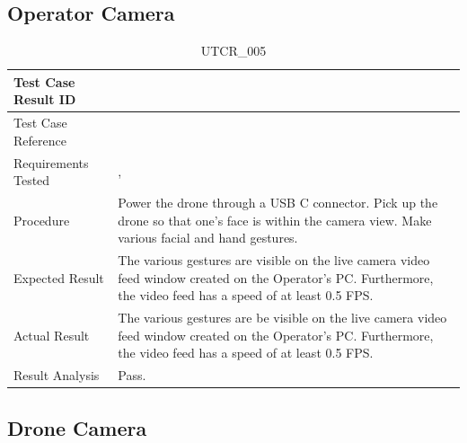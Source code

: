 \documentclass[12pt, titlepage]{article}
\begin{document}
\clearpage

\subsection{Operator Camera}
\label{subsec:operatorCam}

\begin{table}[!h]
\begin{center}
\caption {UTCR\_005}
\label{tab:UTCR_005}
\begin{tabular}{ | m{3.2cm} | m{12.2cm} | } 
\hline
Test Case Result ID & \nameref{tab:UTCR_005} \\ 
\hline
Test Case Reference & \nameref{tab:UTC_005}  \\ 
\hline
Requirements Tested & \nameref{GEN_002}, \nameref{PERF_004} \\ 
\hline
Procedure & Power the drone through a USB C connector. Pick up the drone so that one's face is within the camera view. Make various facial and hand gestures. \\ 
\hline
Expected Result & The various gestures are visible on the live camera video feed window created on the Operator's PC. Furthermore, the video feed has a speed of at least 0.5 FPS. \\ 
\hline
Actual Result & The various gestures are be visible on the live camera video feed window created on the Operator's PC. Furthermore, the video feed has a speed of at least 0.5 FPS. \\ 
\hline
Result Analysis & Pass. \\ 
\hline
\end{tabular}
\end{center}
\end{table}

\clearpage

\subsection{Drone Camera}
\label{subsec:droneCamera}
\end{document}
